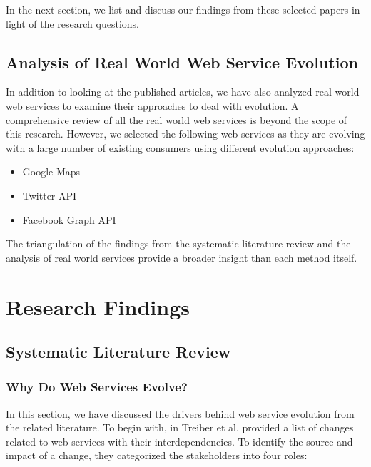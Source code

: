 \documentclass[runningheads,a4paper]{llncs}
\begin{document}
In the next section, we list and discuss our findings from these selected papers in light of the research questions.

\subsection{Analysis of Real World Web Service Evolution} %
\label{sub:analysis_of_real_world_web_service_evolution}
In addition to looking at the published articles, we have also analyzed real world web services to examine their approaches to deal with evolution. A comprehensive review of all the real world web services is beyond the scope of this research. However, we selected the following web services as they are evolving with a large number of existing consumers using different evolution approaches:

\begin{itemize}
  \item Google Maps
  \item Twitter API
  \item Facebook Graph API
\end{itemize}

The triangulation of the findings from the systematic literature review and the analysis of real world services provide a broader insight than each method itself.



\section{Research Findings} %
\label{sec:research_findings}

\subsection{Systematic Literature Review} %
\label{sub:literature_review}

\subsubsection{Why Do Web Services Evolve?} %
\label{sub:why_do_web_services_change}
In this section, we have discussed the drivers behind web service evolution from the related literature. To begin with, in \cite{treiber2009analyzing} Treiber et al. provided a list of changes related to web services with their interdependencies. To identify the source and impact of a change, they categorized the stakeholders into four roles:
\end{document}
